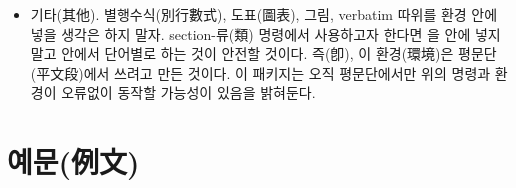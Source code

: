 \documentclass[a4paper,12pt,itemph,footnote]{oblivoir}
\begin{document}
\begin{itemize}
\item \grfoo 기타(其他). \grfoo 별행수식(別行數式), \grfoo 도표(圖表), 그림, verbatim 따위를  환경 안에 넣을 생각은 하지 말자. section-\grfoo 류(類) 명령에서 사용하고자 한다면 \mycmd{\section}을  안에 넣지 말고 \mycmd{\section} 안에서 단어별로 \mycmd{\grfoo}하는 것이 안전할 것이다. \grfoo 즉(卽), 이 \grfoo 환경(環境)은 \grfoo 평문단(平文段)에서 쓰려고 만든 것이다. 이 패키지는 오직 평문단에서만 위의 명령과 환경이 오류없이 동작할 가능성이 있음을 밝혀둔다.
\end{itemize}

\section{\texorpdfstring{\grfoo 예문(例文)}{예문}}
\end{document}
